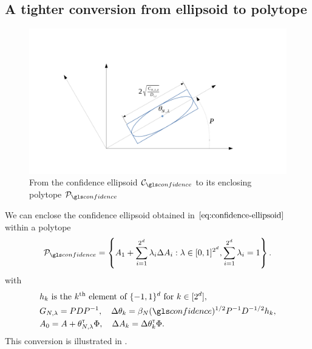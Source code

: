 \begin{subappendices}
	\subsection{A tighter conversion from ellipsoid to polytope}
	\label{sec:tight-polytope}
	
	\begin{figure}[ht]
		\centering
		\includegraphics[trim={3.8cm, 2cm, 5cm, 3.8cm}, clip, width=0.7\linewidth]{img/ellipsoid_to_polytope}
		\caption{From the confidence ellipsoid $\cC_\confidence$ to its enclosing polytope $\cP_\confidence$}
		\label{fig:ellipsoid_to_polytope}
	\end{figure}
	
	\begin{lemma}
		\label{lem:tight_polytope}
		\begin{leftbar}[lemmabar]
		We can enclose the confidence ellipsoid obtained in $\eqref{eq:confidence-ellipsoid}$ within a polytope
		\begin{equation}
		\cP_\confidence = \left\{ A_{1}+\sum_{i=1}^{2^d}\lambda_{i}\Delta A_{i}: \lambda\in[0, 1]^{2^d},  \sum_{i=1}^{2^d}\lambda_{i}=1\right\}.
		\end{equation}
		with 
		\begin{align*}
		&h_k \text{ is the }k^\text{th}\text{ element of }\{-1,1\}^d\text{ for } k\in[2^d],\\
		&G_{N,\lambda} = PDP^{-1}, \quad \Delta\theta_k = \beta_{N}(\confidence)^{1/2} P^{-1}D^{-1/2} h_k, \\
		&A_0 = A + \theta_{N,\lambda}^\transp\Phi, \quad \Delta A_k = \Delta\theta_k^\transp\Phi.
		\end{align*}
		This conversion is illustrated in .
		\end{leftbar}
	\end{lemma}


\end{subappendices}
